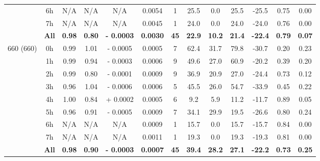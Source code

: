 \documentclass[preview]{standalone}
\begin{document}
\begin{tabular}{ccccccccccccc}
 & 6h  & N/A & N/A & N/A & 0.0054 &  1 & 25.5 & 0.0 & 25.5 & -25.5 & 0.75 & 0.00\\ 
 & 7h  & N/A & N/A & N/A & 0.0045 &  1 & 24.0 & 0.0 & 24.0 & -24.0 & 0.76 & 0.00\\ \cline{2-13}
 & \textbf{All} & \textbf{0.98} & \textbf{0.80} & \textbf{- 0.0003} & \textbf{0.0030} & \textbf{45} & \textbf{22.9} & \textbf{10.2} & \textbf{21.4} & \textbf{-22.4} & \textbf{0.79} & \textbf{0.07} \\ \hline
\multirow{9}{*}{660 (660)} & 0h  & 0.99 & 1.01 & - 0.0005 & 0.0005 &  7 & 62.4 & 31.7 & 79.8 & -30.7 & 0.20 & 0.23 \\ 
 & 1h  & 0.99 & 0.94 & - 0.0003 & 0.0006 &  9 & 49.6 & 27.0 & 60.9 & -20.2 & 0.39 & 0.20 \\ 
 & 2h  & 0.99 & 0.80 & - 0.0001 & 0.0009 &  9 & 36.9 & 20.9 & 27.0 & -24.4 & 0.73 & 0.12 \\ 
 & 3h  & 0.96 & 1.04 & - 0.0006 & 0.0006 &  5 & 45.5 & 26.0 & 54.7 & -33.9 & 0.45 & 0.22 \\ 
 & 4h  & 1.00 & 0.84 & + 0.0002 & 0.0005 &  6 & 9.2 & 5.9 & 11.2 & -11.7 & 0.89 & 0.05 \\ 
 & 5h  & 0.96 & 0.91 & - 0.0005 & 0.0009 &  7 & 34.1 & 29.9 & 19.5 & -26.6 & 0.80 & 0.24 \\ 
 & 6h  & N/A & N/A & N/A & 0.0009 &  1 & 15.7 & 0.0 & 15.7 & -15.7 & 0.84 & 0.00\\ 
 & 7h  & N/A & N/A & N/A & 0.0011 &  1 & 19.3 & 0.0 & 19.3 & -19.3 & 0.81 & 0.00\\ \cline{2-13}
 & \textbf{All} & \textbf{0.98} & \textbf{0.90} & \textbf{- 0.0003} & \textbf{0.0007} & \textbf{45} & \textbf{39.4} & \textbf{28.2} & \textbf{27.1} & \textbf{-22.2} & \textbf{0.73} & \textbf{0.25} \\ 
\hline 
\end{tabular}
\end{document}

